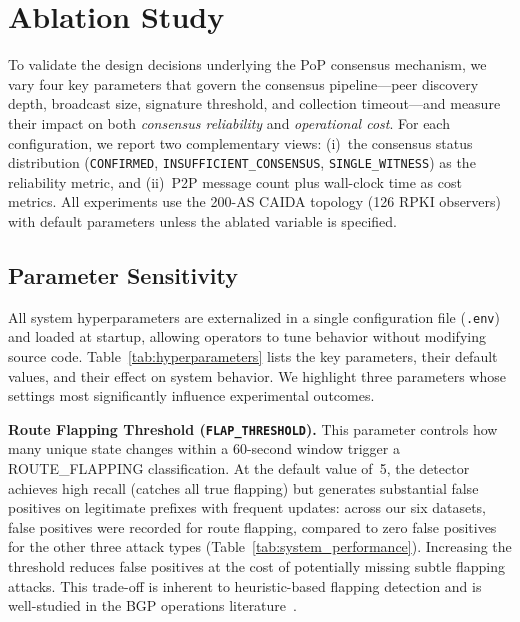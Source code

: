 
\section{Ablation Study}
\label{sec:ablation}

To validate the design decisions underlying the PoP consensus mechanism, we vary four key parameters that govern the consensus pipeline---peer discovery depth, broadcast size, signature threshold, and collection timeout---and measure their impact on both \emph{consensus reliability} and \emph{operational cost}. For each configuration, we report two complementary views: (i)~the consensus status distribution (\texttt{CONFIRMED}, \texttt{INSUFFICIENT\_CONSENSUS}, \texttt{SINGLE\_WITNESS}) as the reliability metric, and (ii)~P2P message count plus wall-clock time as cost metrics. All experiments use the 200-AS CAIDA topology (126 RPKI observers) with default parameters unless the ablated variable is specified.

\subsection{Parameter Sensitivity}
\label{subsec:parameter_sensitivity}

All system hyperparameters are externalized in a single configuration file (\texttt{.env}) and loaded at startup, allowing operators to tune behavior without modifying source code. Table~\ref{tab:hyperparameters} lists the key parameters, their default values, and their effect on system behavior. We highlight three parameters whose settings most significantly influence experimental outcomes.

\textbf{Route Flapping Threshold (\texttt{FLAP\_THRESHOLD}).} This parameter controls how many unique state changes within a 60-second window trigger a ROUTE\_FLAPPING classification. At the default value of~5, the detector achieves high recall (catches all true flapping) but generates substantial false positives on legitimate prefixes with frequent updates: across our six datasets, false positives were recorded for route flapping, compared to zero false positives for the other three attack types (Table~\ref{tab:system_performance}). Increasing the threshold reduces false positives at the cost of potentially missing subtle flapping attacks. This trade-off is inherent to heuristic-based flapping detection and is well-studied in the BGP operations literature~\cite{rfc2439}.

